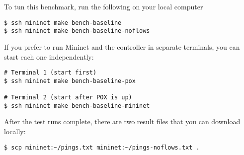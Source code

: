 To tun this benchmark, run the following on your local computer

\begin{Verbatim}
$ ssh mininet make bench-baseline
$ ssh mininet make bench-baseline-noflows
\end{Verbatim}

If you prefer to run Mininet and the controller in separate terminals, you
can start each one independently:

\begin{Verbatim}
# Terminal 1 (start first)
$ ssh mininet make bench-baseline-pox

# Terminal 2 (start after POX is up)
$ ssh mininet make bench-baseline-mininet
\end{Verbatim}

After the test runs complete, there are two result files that you can
download locally:

\begin{Verbatim}
$ scp mininet:~/pings.txt mininet:~/pings-noflows.txt .
\end{Verbatim}
